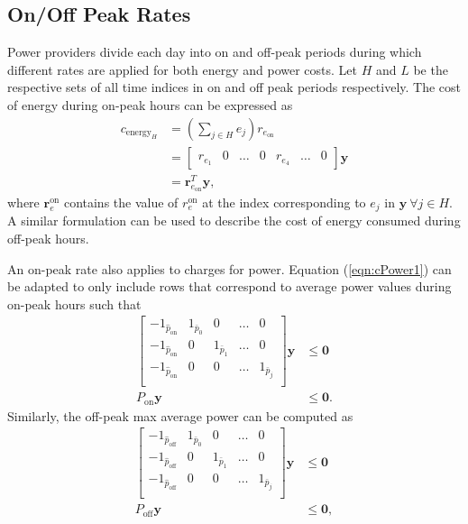 \subsection{On/Off Peak Rates}
Power providers divide each day into on and off-peak periods during which different rates are applied for both energy and power costs. Let $H$ and $L$ be the respective sets of all time indices in on and off peak periods respectively. The cost of energy during on-peak hours can be expressed as 
\begin{equation}\label{eqn:cEnergy1}
	\begin{aligned}
		c_{\text{energy}_H} &= \left ( \sum_{j\in H} e_j \right ) r_{e_\text{on}} \\
		&= \begin{bmatrix}r_{e_1} & 0 & \hdots & 0 & r_{e_4} & \hdots & 0 \end{bmatrix}\mathbf{y} \\
		&= \mathbf{r}_{e_\text{on}}^T\mathbf{y},
	\end{aligned}
\end{equation}
where $\mathbf{r}^\text{on}_{e}$ contains the value of $r^\text{on}_{e}$ at the index corresponding to $e_j$ in $\mathbf{y} \ \forall j \in H$. A similar formulation can be used to describe the cost of energy consumed during off-peak hours.  
\par An on-peak rate also applies to charges for power. Equation (\ref{eqn:cPower1}) can be adapted to only include rows that correspond to average power values during on-peak hours such that
\begin{equation}\label{eqn:cPOnPeak} 
	\begin{aligned}
		 \begin{bmatrix} 
			 -1_{\hat{p}_\text{on}} & 1_{\bar{p}_0} & 0             & \hdots & 0 \\ 
			 -1_{\hat{p}_\text{on}} & 0       & 1_{\bar{p}_1} & \hdots & 0\\
			 -1_{\hat{p}_\text{on}} & 0       & 0 & \hdots    & 1_{\bar{p}_j} \\
		 \end{bmatrix}\mathbf{y} &\le \mathbf{0} \\ 
		 P_{\text{on}}\mathbf{y} &\le \mathbf{0}.  
	\end{aligned}
\end{equation}
Similarly, the off-peak max average power can be computed as
\begin{equation}\label{eqn:cPOffPeak}
	\begin{aligned}
		 \begin{bmatrix} 
			 -1_{\hat{p}_\text{off}} & 1_{\bar{p}_0} & 0             & \hdots & 0 \\ 
			 -1_{\hat{p}_\text{off}} & 0       & 1_{\bar{p}_1} & \hdots & 0\\
			 -1_{\hat{p}_\text{off}} & 0       & 0 & \hdots    & 1_{\bar{p}_j} \\
		 \end{bmatrix}\mathbf{y} &\le \mathbf{0} \\ 
		 P_{\text{off}}\mathbf{y} &\le \mathbf{0},  
	\end{aligned}
\end{equation}
